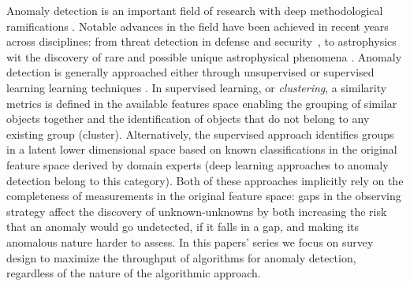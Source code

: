 \documentclass[onecolumn, 10pt]{aastex63}
\begin{document}
Anomaly detection is an important field of research with deep methodological ramifications \citep{AD2009}. Notable advances in the field have been achieved in recent years across disciplines: from threat detection in defense and security~\citep[e.g.][]{sultani2018real}, to astrophysics~\citep{Soraisam20} wit the discovery of rare and possible unique astrophysical phenomena \citep[although we note that two of these genuine "unknown-unknowns" were detected through crowdsourcing data analysis]{Voorwerp09, oumuamua, tabbysstar}.  Anomaly detection is generally approached either through unsupervised or supervised learning learning techniques \citep[e.g.][]{10.1007/11881599_134, bishop2006, hastie2009elements}. In supervised learning, or \emph{clustering}, a  similarity metrics is defined in the available features space enabling the grouping of similar objects together and the identification of objects that do not belong to any existing group (cluster). Alternatively, the supervised approach identifies groups in a latent lower dimensional space based on known classifications in the original feature space derived by domain experts (deep learning approaches to anomaly detection belong to this category). Both of these approaches implicitly rely on the completeness of measurements in the original feature space: gaps in the observing strategy  affect the discovery of unknown-unknowns by both increasing the risk that an anomaly would go undetected, if it falls in a gap, and making its anomalous nature harder to assess. In this papers' series we focus on survey design to maximize the throughput of algorithms for anomaly detection, regardless of the nature of the algorithmic approach.
\end{document}
